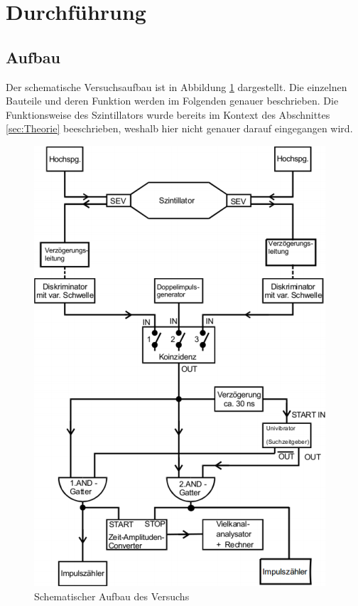 \section{Durchführung}
\label{sec:Durchführung}

\subsection{Aufbau}

Der schematische Versuchsaufbau ist in Abbildung \ref{fig:aufbau1} dargestellt. Die einzelnen Bauteile und deren Funktion werden im Folgenden genauer beschrieben. Die 
Funktionsweise des Szintillators wurde bereits im Kontext des Abschnittes \ref{sec:Theorie} beeschrieben, weshalb hier nicht genauer darauf eingegangen wird.

\begin{figure}
    \centering
    \includegraphics[width=\textwidth]{data/aufbau_skizze_1.png}
    \caption{Schematischer Aufbau des Versuchs}
    \label{fig:aufbau1}
\end{figure}

